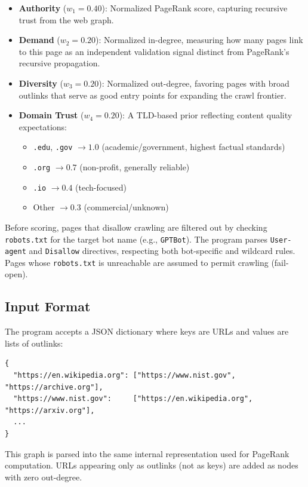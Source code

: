 \documentclass{article}
\begin{document}
\begin{itemize}
    \item \textbf{Authority} ($w_1 = 0.40$): Normalized PageRank score, capturing recursive trust from the web graph.
    \item \textbf{Demand} ($w_2 = 0.20$): Normalized in-degree, measuring how many pages link to this page as an independent validation signal distinct from PageRank's recursive propagation.
    \item \textbf{Diversity} ($w_3 = 0.20$): Normalized out-degree, favoring pages with broad outlinks that serve as good entry points for expanding the crawl frontier.
    \item \textbf{Domain Trust} ($w_4 = 0.20$): A TLD-based prior reflecting content quality expectations:
    \begin{itemize}
        \item \texttt{.edu}, \texttt{.gov} $\to 1.0$ (academic/government, highest factual standards)
        \item \texttt{.org} $\to 0.7$ (non-profit, generally reliable)
        \item \texttt{.io} $\to 0.4$ (tech-focused)
        \item Other $\to 0.3$ (commercial/unknown)
    \end{itemize}
\end{itemize}

Before scoring, pages that disallow crawling are filtered out by checking \texttt{robots.txt} for the target bot name (e.g., \texttt{GPTBot}). The program parses \texttt{User-agent} and \texttt{Disallow} directives, respecting both bot-specific and wildcard rules. Pages whose \texttt{robots.txt} is unreachable are assumed to permit crawling (fail-open).

\subsection{Input Format}

The program accepts a JSON dictionary where keys are URLs and values are lists of outlinks:

\begin{verbatim}
{
  "https://en.wikipedia.org": ["https://www.nist.gov", "https://archive.org"],
  "https://www.nist.gov":     ["https://en.wikipedia.org", "https://arxiv.org"],
  ...
}
\end{verbatim}

This graph is parsed into the same internal representation used for PageRank computation. URLs appearing only as outlinks (not as keys) are added as nodes with zero out-degree.
\end{document}
